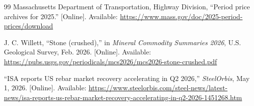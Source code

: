 \documentclass[11pt]{article}
\begin{document}
\begin{thebibliography}{99}
Massachusetts Department of Transportation, Highway Division, ``Period price archives for 2025.'' [Online]. Available: \url{https://www.mass.gov/doc/2025-period-prices/download}

J. C. Willett, ``Stone (crushed),'' in \emph{Mineral Commodity Summaries 2026}, U.S. Geological Survey, Feb. 2026. [Online]. Available: \url{https://pubs.usgs.gov/periodicals/mcs2026/mcs2026-stone-crushed.pdf}

``ISA reports US rebar market recovery accelerating in Q2 2026,'' \emph{SteelOrbis}, May 1, 2026. [Online]. Available: \url{https://www.steelorbis.com/steel-news/latest-news/isa-reports-us-rebar-market-recovery-accelerating-in-q2-2026-1451268.htm}

\end{thebibliography}
\end{document}
